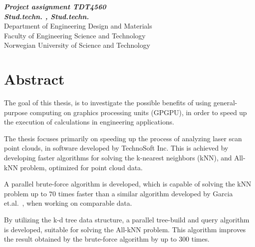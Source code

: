 \begin{center}
{\Large\bfseries \mytitle}
\end{center}

\begin{center}
{\bfseries\slshape Project assignment TDT4560}
\\[1.0cm]
{\bfseries\slshape
Stud.techn. \myauthorA, Stud.techn. \myauthorB \\}
Department of Engineering Design and Materials \\
Faculty of Engineering Science and Technology\\
Norwegian University of Science and Technology
\end{center}
\section*{Abstract}

The goal of this thesis, is to investigate the possible benefits of using general-purpose computing on graphics processing units (GPGPU), in order to speed up the execution of calculations in engineering applications.

The thesis focuses primarily on speeding up the process of analyzing laser scan point clouds, in software developed by TechnoSoft Inc. This is achieved by developing faster algorithms for solving the k-nearest neighbors (kNN), and All-kNN problem, optimized for point cloud data.

A parallel brute-force algorithm is developed, which is capable of solving the kNN problem up to $70$ times faster than a similar algorithm developed by Garcia et.al\@.~\cite{Garcia2008}, when working on comparable data.

By utilizing the k-d tree data structure, a parallel tree-build and query algorithm is developed, suitable for solving the All-kNN problem. This algorithm improves the result obtained by the brute-force algorithm by up to $300$ times.







\clearpage\
